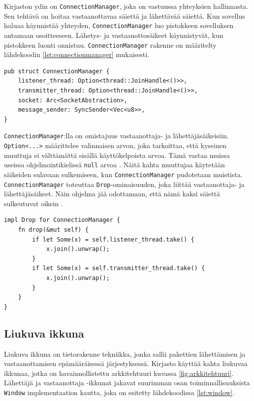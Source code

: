 \documentclass[a4paper,12pt]{article}
\begin{document}
    Kirjaston ydin on \lstinline{ConnectionManager}, joka on vastuussa yhteyksien hallinnasta. Sen tehtävä on
    hoitaa vastaanottavaa säiettä ja lähettävää säiettä. Kun sovellus haluaa käynnistää yhteyden,
    \lstinline{ConnectionManager} luo pistokkeen sovelluksen antamaan osoitteeseen.
    Lähetys- ja vastaanottosäikeet käynnistyvät, kun pistokkeen luonti onnistuu. \lstinline{ConnectionManager} rakenne on määritelty lähdekoodin \ref{lst:connectionmanager} mukaisesti.
    
    \begin{lstlisting}[caption={ConnectionManager:n rakenne}, label={lst:connectionmanager}]
pub struct ConnectionManager {
    listener_thread: Option<thread::JoinHandle<()>>,
    transmitter_thread: Option<thread::JoinHandle<()>>,
    socket: Arc<SocketAbstraction>,
    message_sender: SyncSender<Vec<u8>>,
}\end{lstlisting}

    

    \lstinline{ConnectionManager}:lla on omistajuus vastaanottaja- ja lähettäjäsäikeisiin.
    \lstinline{Option<...>} määrittelee valinnaisen arvon, joka tarkoittaa, että kyseinen muuttuja ei
    välttämättä sisällä käyttökelpoista arvoa. Tämä vastaa muissa useissa ohjelmointikielissä \lstinline{null} arvoa \cite[luku 6.1]{rust-book}. Näitä kahta muuttujaa käytetään säikeiden sulavaan sulkemiseen, kun \lstinline{ConnectionManager} pudotetaan muistista. \lstinline{ConnectionManager} toteuttaa \lstinline{Drop}-ominaisuuden, joka liittää vastaanottaja-
    ja lähettäjäsäikeet. Näin ohjelma jää odottamaan, että nämä kaksi säiettä sulkeutuvat oikein \cite{rust_doc_joinhandle}.
    
    \architecture
    

    \begin{lstlisting}[caption={Drop-ominaisuuden toteutus ConnectionManager:ille}, label={lst:connectionmanager_drop}]
impl Drop for ConnectionManager {
    fn drop(&mut self) {
        if let Some(x) = self.listener_thread.take() {
            x.join().unwrap();
        }
        if let Some(x) = self.transmitter_thread.take() {
            x.join().unwrap();
        }
    }
}\end{lstlisting}



    \subsection{Liukuva ikkuna}\label{sec:liukuva_ikkuna}
    Liukuva ikkuna on tietorakenne tekniikka, jonka sallii pakettien lähettämisen ja vastaanottamisen epämääräisessä järjestyksessä. 
    Kirjasto käyttää kahta liukuvaa ikkunaa, jotka on havainnollistettu arkkitehtuuri kuvassa \ref{fig:arkkitehtuuri}. Lähettäjä ja vastaanottaja -ikkunat jakavat suurimman osan toiminnallisuuksista \lstinline{Window} implementaation kautta, joka on esitetty lähdekoodissa \ref{lst:window}. 
\end{document}
